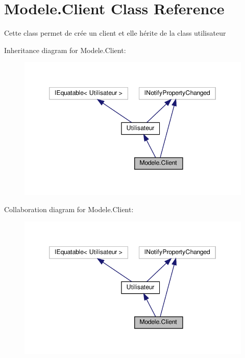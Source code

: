 \hypertarget{classModele_1_1Client}{}\section{Modele.\+Client Class Reference}
\label{classModele_1_1Client}


Cette class permet de crée un client et elle hérite de la class utilisateur  




Inheritance diagram for Modele.\+Client\+:
\nopagebreak
\begin{figure}[H]
\begin{center}
\leavevmode
\includegraphics[width=346pt]{classModele_1_1Client__inherit__graph}
\end{center}
\end{figure}


Collaboration diagram for Modele.\+Client\+:
\nopagebreak
\begin{figure}[H]
\begin{center}
\leavevmode
\includegraphics[width=346pt]{classModele_1_1Client__coll__graph}
\end{center}
\end{figure}
